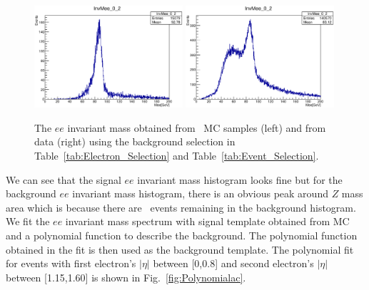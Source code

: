 \begin{figure}[htbp] 
  \centering
  \includegraphics[width=0.49\textwidth]{figures/ChargeMisID/MergeEt_Ntot_ZeeBkg02.eps}
  \includegraphics[width=0.49\textwidth]{figures/ChargeMisID/MergeEt_Ntot_Bkg02.eps}
  \caption{The $ee$ invariant mass obtained from \Zee\ MC samples
    (left) and from data (right) using the background selection in
    Table~\ref{tab:Electron_Selection} and
    Table~\ref{tab:Event_Selection}.}
  \label{fig:Mee}
\end{figure}

 We can see that the signal $ee$ invariant mass histogram looks fine
 but for the background $ee$ invariant mass histogram, there is an
 obvious peak around $Z$ mass area which is because there are
 \Zee\ events remaining in the background histogram. We fit the $ee$
 invariant mass spectrum with signal template obtained from MC and a
 polynomial function to describe the background. The polynomial
 function obtained in the fit is then used as the background
 template. The polynomial fit for events with first electron's
 $|\eta|$ between [0,0.8] and second electron's $|\eta|$ between
 [1.15,1.60] is shown in Fig.~\ref{fig:Polynomialac}.

